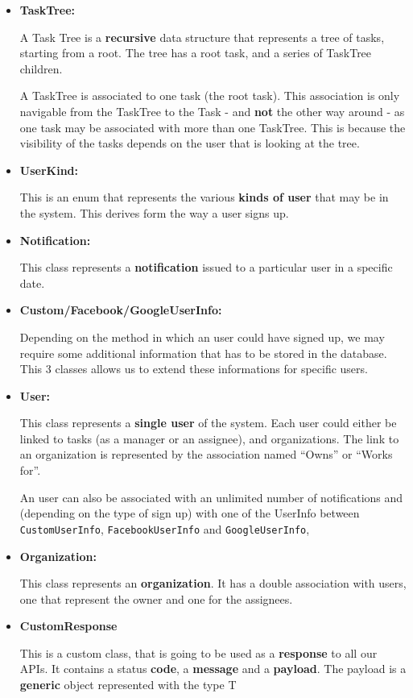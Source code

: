 \documentclass{article}
\begin{document}
\begin{itemize}
    \item \textbf{TaskTree: }
    
    A Task Tree is a \textbf{recursive} data structure that represents a tree of tasks, starting from a root.
    The tree has a root task, and a series of TaskTree children.

    A TaskTree is associated to one task (the root task). This association is only navigable from the TaskTree to the Task - and \textbf{not} the other way around - 
    as one task may be associated with more than one TaskTree. This is because
    the visibility of the tasks depends on the user that is looking at the tree.

    \item \textbf{UserKind: }

    This is an enum that represents the various \textbf{kinds of user} that may be in the system.
    This derives form the way a user signs up.

    \item \textbf{Notification: }
    
    This class represents a \textbf{notification} issued to a particular user in a specific date.

    \item \textbf{Custom/Facebook/GoogleUserInfo: }
    
    Depending on the method in which an user could have signed up, we may require some additional
    information that has to be stored in the database. This 3 classes allows us to extend these informations
    for specific users.

    \item \textbf{User: }
    
    This class represents a \textbf{single user} of the system. Each user could either be linked to tasks (as a manager or an assignee),
    and organizations.
    The link to an organization is represented by the association named ``Owns'' or ``Works for''.

    An user can also be associated with an unlimited number of notifications and (depending on the type of sign up) 
    with one of the UserInfo between \texttt{CustomUserInfo}, \texttt{FacebookUserInfo} and \texttt{GoogleUserInfo},

    \item \textbf{Organization: }
    
    This class represents an \textbf{organization}. It has a double association with users, one that represent the owner and one for the assignees.


    \item \textbf{CustomResponse}

    This is a custom class, that is going to be used as a \textbf{response} to all our APIs.
    It contains a status \textbf{code}, a \textbf{message} and a \textbf{payload}.
    The payload is a \textbf{generic} object represented with the type T
\end{itemize}
\end{document}
